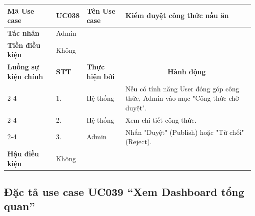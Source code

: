 \documentclass[../main.tex]{subfiles}
\begin{document}
\begin{longtable}{|p{2.7cm}|p{0.8cm}|p{2.6cm}|p{7.3cm}|}
\hline
\cellcolor[HTML]{D5F5E3}\textbf{Mã Use case} & \multicolumn{1}{l|}{UC038} & \cellcolor[HTML]{D5F5E3}\textbf{Tên Use case} & Kiểm duyệt công thức nấu ăn \\ \hline
\cellcolor[HTML]{D5F5E3}\textbf{Tác nhân} & \multicolumn{3}{p{10.7cm}|}{Admin} \\ \hline
\cellcolor[HTML]{D5F5E3}\textbf{Tiền điều kiện} & \multicolumn{3}{p{10.7cm}|}{Không} \\ \hline

\cellcolor[HTML]{D5F5E3}\textbf{Luồng sự kiện chính} & \cellcolor[HTML]{FDEBD0}\textbf{STT} & \cellcolor[HTML]{FDEBD0}\textbf{Thực hiện bởi} & \multicolumn{1}{c|}{\cellcolor[HTML]{FDEBD0}\textbf{Hành động}} \\ \cline{2-4} 
\cellcolor[HTML]{D5F5E3} & 1. & Hệ thống & Nếu có tính năng User đóng góp công thức, Admin vào mục "Công thức chờ duyệt". \\ \cline{2-4} 
\cellcolor[HTML]{D5F5E3} & 2. & Hệ thống & Xem chi tiết công thức. \\ \cline{2-4} 
\cellcolor[HTML]{D5F5E3} & 3. & Admin & Nhấn "Duyệt" (Publish) hoặc "Từ chối" (Reject). \\ \hline

\cellcolor[HTML]{D5F5E3}\textbf{Hậu điều kiện} & \multicolumn{3}{p{10.7cm}|}{Không} \\ \hline
\end{longtable}
\endgroup

\subsection{Đặc tả use case UC039 ``Xem Dashboard tổng quan''}
\vspace{0.5cm}

\begingroup
\renewcommand{\arraystretch}{1.5}
\end{document}
